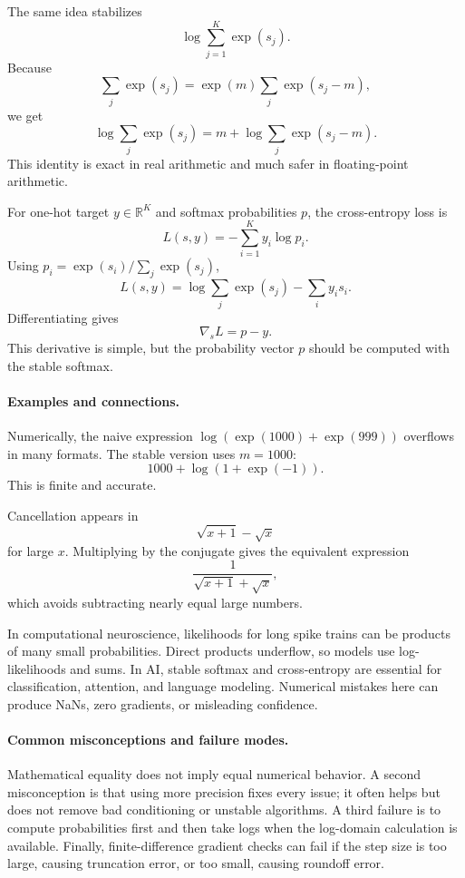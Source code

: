 The same idea stabilizes
\[
\log\sum_{j=1}^K\exp(s_j).
\]
Because
\[
\sum_j\exp(s_j)=\exp(m)\sum_j\exp(s_j-m),
\]
we get
\[
\boxed{\log\sum_j\exp(s_j)
=m+\log\sum_j\exp(s_j-m).}
\]
This identity is exact in real arithmetic and much safer in floating-point arithmetic.

For one-hot target \(y\in\mathbb{R}^K\) and softmax probabilities \(p\), the cross-entropy loss is
\[
L(s,y)=-\sum_{i=1}^K y_i\log p_i.
\]
Using \(p_i=\exp(s_i)/\sum_j\exp(s_j)\),
\[
L(s,y)=\log\sum_j\exp(s_j)-\sum_i y_i s_i.
\]
Differentiating gives
\[
\boxed{\nabla_s L=p-y.}
\]
This derivative is simple, but the probability vector \(p\) should be computed with the stable softmax.

\paragraph{Examples and connections.}
Numerically, the naive expression \(\log(\exp(1000)+\exp(999))\) overflows in many formats. The stable version uses \(m=1000\):
\[
1000+\log(1+\exp(-1)).
\]
This is finite and accurate.

Cancellation appears in
\[
\sqrt{x+1}-\sqrt{x}
\]
for large \(x\). Multiplying by the conjugate gives the equivalent expression
\[
\frac{1}{\sqrt{x+1}+\sqrt{x}},
\]
which avoids subtracting nearly equal large numbers.

In computational neuroscience, likelihoods for long spike trains can be products of many small probabilities. Direct products underflow, so models use log-likelihoods and sums. In AI, stable softmax and cross-entropy are essential for classification, attention, and language modeling. Numerical mistakes here can produce NaNs, zero gradients, or misleading confidence.

\paragraph{Common misconceptions and failure modes.}
Mathematical equality does not imply equal numerical behavior. A second misconception is that using more precision fixes every issue; it often helps but does not remove bad conditioning or unstable algorithms. A third failure is to compute probabilities first and then take logs when the log-domain calculation is available. Finally, finite-difference gradient checks can fail if the step size is too large, causing truncation error, or too small, causing roundoff error.

